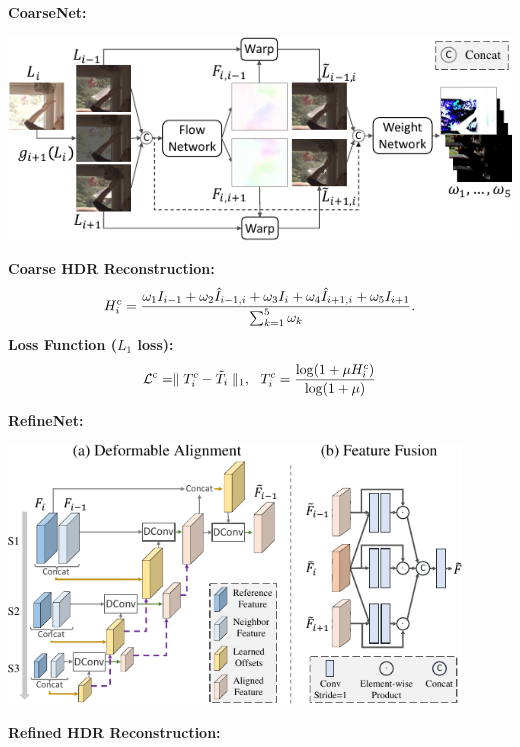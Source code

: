 \documentclass[landscape,a0paper,fontscale=0.292]{baposter}
\newcommand{\subheadercolor}{black}
\newcommand{\hdr}{H}
\newcommand{\tmhdr}{T}
\newcommand{\gttmhdr}{\tilde{\tmhdr}}
\newcommand{\lhdr}{I}
\newcommand{\warplhdr}{\hat{I}}
\newcommand{\weight}{\omega}
\newcommand{\coarsehdr}{\hdr^c}
\newcommand{\coarsetmhdr}{\tmhdr^c}
\newcommand{\coarseloss}{\mathcal{L}^\text{c}}
\begin{document}
\begin{poster}
{    \vspace{0.2em}
    \begin{minipage}[c]{0.48\linewidth}
        \textbf{\color{\subheadercolor}CoarseNet:}
        \begin{center}
            \includegraphics[width=\textwidth]{images/coarsenet-crop.pdf}
        \end{center}
    \end{minipage}
    \hfill
    \begin{minipage}[c]{0.48\linewidth}
        \textbf{\color{\subheadercolor}Coarse HDR Reconstruction:}
        \begin{equation}
            \tiny
            \label{eq:weighted_sum}
            \coarsehdr_i = \frac{\weight_1 \lhdr_{i-1} + \weight_2 \warplhdr_{i-1,i} + \weight_3 \lhdr_i + \weight_4 \warplhdr_{i+1,i} + \weight_5 \lhdr_{i+1}}{\sum_{k=1}^5 \weight_k}.
        \end{equation}
        \textbf{\color{\subheadercolor}Loss Function ($L_1$ loss):}
        \begin{equation}
            \label{eq:mutonemap}
            \tiny
            \coarseloss = \parallel \coarsetmhdr_i - \gttmhdr_i \parallel_1, \quad  \coarsetmhdr_i = \frac{\log(1+\mu \coarsehdr_i)}{\log(1+\mu)}
        \end{equation}
    \end{minipage}

    \begin{minipage}[c]{0.48\linewidth}
        \textbf{\color{\subheadercolor}RefineNet:}
        \vspace{-0.5em}
        \begin{center}
            \includegraphics[width=0.9\textwidth]{images/deformable_fusion_module-crop.pdf}
        \end{center}
    \end{minipage}
    \hfill
    \begin{minipage}[c]{0.48\linewidth}
        \textbf{\color{\subheadercolor}Refined HDR Reconstruction:}


\end{minipage}}
\end{poster}
\end{document}
